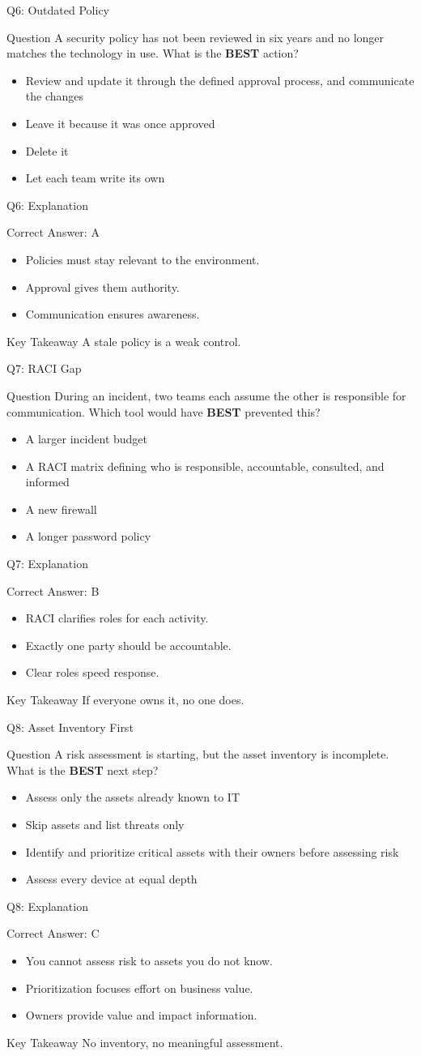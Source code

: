\documentclass[aspectratio=169]{beamer}
\newcommand{\hq}[7]{%
	\begin{frame}{Q#1: #2}
		\begin{block}{Question}
			#3
		\end{block}
		\begin{itemize}
			#4
		\end{itemize}
	\end{frame}
	\begin{frame}{Q#1: Explanation}
		\begin{block}{Correct Answer: #5}
			\begin{itemize}
				#6
			\end{itemize}
		\end{block}
		\begin{alertblock}{Key Takeaway}
			#7
		\end{alertblock}
	\end{frame}
}
\begin{document}
	\hq{6}{Outdated Policy}
	{A security policy has not been reviewed in six years and no longer matches the technology in use. What is the \textbf{BEST} action?}
	{\item[\textbf{(A)}] Review and update it through the defined approval process, and communicate the changes
		\item[\textbf{(B)}] Leave it because it was once approved
		\item[\textbf{(C)}] Delete it
		\item[\textbf{(D)}] Let each team write its own}
	{A}
	{\item Policies must stay relevant to the environment.
		\item Approval gives them authority.
		\item Communication ensures awareness.}
	{A stale policy is a weak control.}
	
	\hq{7}{RACI Gap}
	{During an incident, two teams each assume the other is responsible for communication. Which tool would have \textbf{BEST} prevented this?}
	{\item[\textbf{(A)}] A larger incident budget
		\item[\textbf{(B)}] A RACI matrix defining who is responsible, accountable, consulted, and informed
		\item[\textbf{(C)}] A new firewall
		\item[\textbf{(D)}] A longer password policy}
	{B}
	{\item RACI clarifies roles for each activity.
		\item Exactly one party should be accountable.
		\item Clear roles speed response.}
	{If everyone owns it, no one does.}
	
	\hq{8}{Asset Inventory First}
	{A risk assessment is starting, but the asset inventory is incomplete. What is the \textbf{BEST} next step?}
	{\item[\textbf{(A)}] Assess only the assets already known to IT
		\item[\textbf{(B)}] Skip assets and list threats only
		\item[\textbf{(C)}] Identify and prioritize critical assets with their owners before assessing risk
		\item[\textbf{(D)}] Assess every device at equal depth}
	{C}
	{\item You cannot assess risk to assets you do not know.
		\item Prioritization focuses effort on business value.
		\item Owners provide value and impact information.}
	{No inventory, no meaningful assessment.}
	
\end{document}
